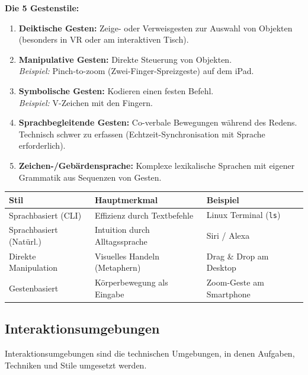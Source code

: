 \documentclass[12pt, a4paper]{article}
\begin{document}
\textbf{Die 5 Gestenstile:}
\begin{enumerate}
  \item \textbf{Deiktische Gesten:} Zeige- oder Verweisgesten zur Auswahl von
        Objekten (besonders in VR oder am interaktiven Tisch).
  \item \textbf{Manipulative Gesten:} Direkte Steuerung von Objekten.\\
        \textit{Beispiel:} Pinch-to-zoom (Zwei-Finger-Spreizgeste) auf dem iPad.
  \item \textbf{Symbolische Gesten:} Kodieren einen festen Befehl.\\
        \textit{Beispiel:} \glqq{}V\grqq{}-Zeichen mit den Fingern.
  \item \textbf{Sprachbegleitende Gesten:} Co-verbale Bewegungen während des
        Redens. Technisch schwer zu erfassen (Echtzeit-Synchronisation mit Sprache
        erforderlich).
  \item \textbf{Zeichen-/Gebärdensprache:} Komplexe lexikalische Sprachen mit
        eigener Grammatik aus Sequenzen von Gesten.
\end{enumerate}

\vspace{0.5em}
\begin{center}
\begin{tabular}{p{3.5cm} p{5cm} p{4cm}}
\hline
\textbf{Stil} & \textbf{Hauptmerkmal} & \textbf{Beispiel} \\
\hline
Sprachbasiert (CLI)     & Effizienz durch Textbefehle       & Linux Terminal (\texttt{ls}) \\[3pt]
Sprachbasiert (Natürl.) & Intuition durch Alltagssprache    & Siri / Alexa \\[3pt]
Direkte Manipulation    & Visuelles Handeln (Metaphern)     & Drag \& Drop am Desktop \\[3pt]
Gestenbasiert           & Körperbewegung als Eingabe        & Zoom-Geste am Smartphone \\
\hline
\end{tabular}
\end{center}

\subsection{Interaktionsumgebungen}

Interaktionsumgebungen sind die technischen Umgebungen, in denen Aufgaben, Techniken
und Stile umgesetzt werden.
\end{document}
